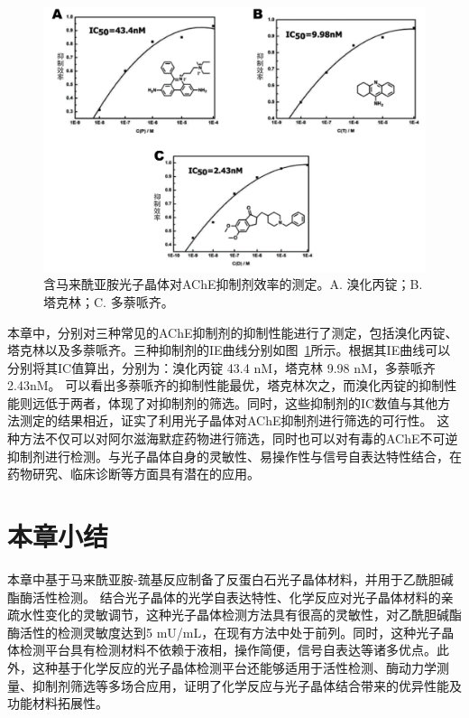 \begin{figure}[htbp]
  \centering
  \includegraphics[width=\linewidth]{figures/ch3/inhibitor.png}
  \caption{含马来酰亚胺光子晶体对AChE抑制剂效率的测定。A. 溴化丙锭；B. 塔克林；C. 多萘哌齐。}
  \label{fig:maleimide-inhibitor}
\end{figure}

本章中，分别对三种常见的AChE抑制剂的抑制性能进行了测定，包括溴化丙锭、塔克林以及多萘哌齐。三种抑制剂的IE曲线分别如图~\ref{fig:maleimide-inhibitor}所示。根据其IE曲线可以分别将其IC值算出，分别为：溴化丙锭 43.4 nM，塔克林 9.98 nM，多萘哌齐 2.43nM。
可以看出多萘哌齐的抑制性能最优，塔克林次之，而溴化丙锭的抑制性能则远低于两者，体现了对抑制剂的筛选。同时，这些抑制剂的IC数值与其他方法测定的结果相近，证实了利用光子晶体对AChE抑制剂进行筛选的可行性。
这种方法不仅可以对阿尔滋海默症药物进行筛选，同时也可以对有毒的AChE不可逆抑制剂进行检测。与光子晶体自身的灵敏性、易操作性与信号自表达特性结合，在药物研究、临床诊断等方面具有潜在的应用。

\section{本章小结}

本章中基于马来酰亚胺-巯基反应制备了反蛋白石光子晶体材料，并用于乙酰胆碱酯酶活性检测。
结合光子晶体的光学自表达特性、化学反应对光子晶体材料的亲疏水性变化的灵敏调节，这种光子晶体检测方法具有很高的灵敏性，对乙酰胆碱酯酶活性的检测灵敏度达到5 mU/mL，在现有方法中处于前列。同时，这种光子晶体检测平台具有检测材料不依赖于液相，操作简便，信号自表达等诸多优点。此外，这种基于化学反应的光子晶体检测平台还能够适用于活性检测、酶动力学测量、抑制剂筛选等多场合应用，证明了化学反应与光子晶体结合带来的优异性能及功能材料拓展性。